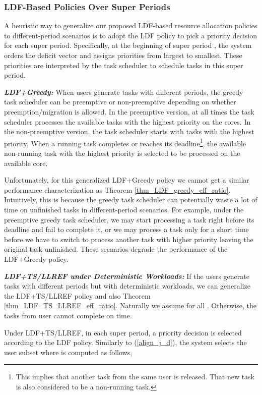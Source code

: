 \documentclass[prodmode,acmtompecs]{acmsmall}
\begin{document}
\subsubsection{LDF-Based Policies Over Super Periods}

A heuristic way to generalize our proposed LDF-based resource allocation policies to different-period scenarios is to adopt the LDF policy to pick a priority decision for each super period.  
Specifically, at the beginning of super period , the system orders the deficit vector  and assigns priorities from largest to smallest. 
These priorities are interpreted by the task scheduler to schedule tasks in this super period. 

{\bf \em LDF+Greedy:}
When users generate tasks with different periods, the greedy task scheduler can be preemptive or non-preemptive depending on whether preemption/migration is allowed. In the preemptive version, at all times the task scheduler processes the  available tasks with the highest priority on the  cores. In the non-preemptive version, the task scheduler starts with  tasks with the highest priority. When a running task completes or reaches its deadline\footnote{This implies that another task from the same user is released. That new task is also considered to be a non-running task. }, the available non-running task with the highest priority is selected to be processed on the available core. 

Unfortunately, for this generalized LDF+Greedy policy we cannot get a similar performance characterization as Theorem \ref{thm_LDF_greedy_eff_ratio}. Intuitively, this is because the greedy task scheduler can potentially waste a lot of time on unfinished tasks in different-period scenarios. For example, under the preemptive greedy task scheduler, we may start processing a task right before its deadline and fail to complete it, or we may process a task only for a short time before we have to switch to process another task with higher priority leaving the original task unfinished. These scenarios degrade the performance of the LDF+Greedy policy. 

{\bf \em LDF+TS/LLREF under Deterministic Workloads: }
If the users generate tasks with different periods but with deterministic workloads, we can generalize the LDF+TS/LLREF policy and also Theorem \ref{thm_LDF_TS_LLREF_eff_ratio}. 
Naturally we assume  for all . Otherwise, the tasks from user  cannot complete on time. 

Under LDF+TS/LLREF, in each super period, a priority decision  is selected according to the LDF policy. Similarly to (\ref{align_j_d}), the system selects the user subset  where  is computed as follows, 
\end{document}
